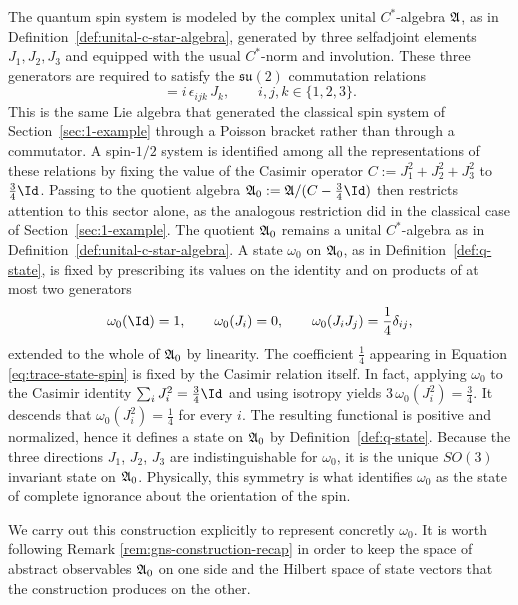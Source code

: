  	The quantum spin system is modeled by the complex unital $C^*$-algebra $\mathfrak{A}$, as in Definition~\ref{def:unital-c-star-algebra}, generated by three selfadjoint elements $J_1, J_2, J_3$ and equipped with the usual $C^*$-norm and involution. These three generators are required to satisfy the $\mathfrak{su}(2)$ commutation relations
 	\begin{equation}
 		[J_i,J_j] = i\,\epsilon_{ijk}\,J_k, \qquad i,j,k\in\{1,2,3\}.
 		\label{eq:su2-commutation}
 	\end{equation}
 	This is the same Lie algebra that generated the classical spin system of Section~\ref{sec:1-example} through a Poisson bracket rather than through a commutator. A spin-$1/2$ system is identified among all the representations of these relations by fixing the value of the Casimir operator $C := J_1^2+J_2^2+J_3^2$ to $\frac34\Id$. Passing to the quotient algebra $\A_0 := \A/(C-\frac34\Id)$ then restricts attention to this sector alone, as the analogous restriction did in the classical case of Section~\ref{sec:1-example}. The quotient $\mathfrak{A}_0$ remains a unital $C^*$-algebra as in Definition~\ref{def:unital-c-star-algebra}.
 	A state $\omega_0$ on $\mathfrak{A}_0$, as in Definition~\ref{def:q-state}, is fixed by prescribing its values on the identity and on products of at most two generators
 	\begin{equation}
 		\omega_0(\Id)=1,\qquad \omega_0(J_i)=0,\qquad \omega_0(J_iJ_j)=\frac14\delta_{ij},
 		\label{eq:trace-state-spin}
 	\end{equation}
 	extended to the whole of $\mathfrak{A}_0$ by linearity. The coefficient $\frac14$ appearing in Equation \eqref{eq:trace-state-spin} is fixed by the Casimir relation itself. In fact, applying $\omega_0$ to the Casimir identity $\sum_i J_i^2 = \frac34\Id$ and using isotropy yields $3\,\omega_0(J_i^2) = \frac34$. It descends that $\omega_0(J_i^2)=\frac14$ for every $i$. The resulting functional is positive and normalized, hence it defines a state on $\mathfrak{A}_0$ by Definition~\ref{def:q-state}. Because the three directions $J_1$, $J_2$, $J_3$ are indistinguishable for $\omega_0$, it is the unique $SO(3)$ invariant state on $\mathfrak{A}_0$. Physically, this symmetry is what identifies $\omega_0$ as the state of complete ignorance about the orientation of the spin.
 	
 	 We carry out this construction explicitly to represent concretly $\omega_0$. It is worth following Remark \ref{rem:gns-construction-recap} in order to keep the space of abstract observables $\mathfrak{A}_0$ on one side and the Hilbert space of state vectors that the construction produces on the other.
 	

